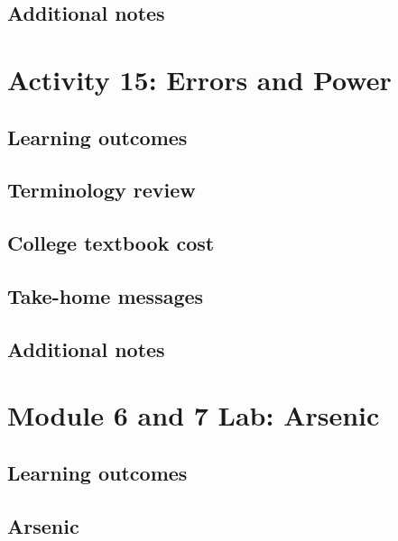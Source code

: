 \documentclass[
]{report}
\begin{document}
\subsection{Additional notes}\label{additional-notes-13}

\section{Activity 15: Errors and Power}\label{activity-15-errors-and-power}

\subsection{Learning outcomes}\label{learning-outcomes-15}

\subsection{Terminology review}\label{terminology-review-13}

\subsection{College textbook cost}\label{college-textbook-cost}

\subsection{Take-home messages}\label{take-home-messages-14}

\subsection{Additional notes}\label{additional-notes-14}

\section{Module 6 and 7 Lab: Arsenic}\label{module-6-and-7-lab-arsenic}

\subsection{Learning outcomes}\label{learning-outcomes-16}

\subsection{Arsenic}\label{arsenic}
\end{document}
